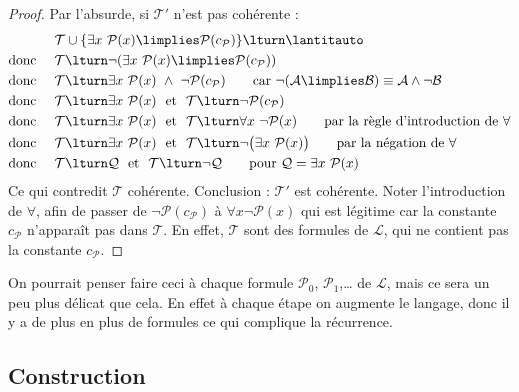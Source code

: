 \documentclass[11pt,class=report,crop=false]{standalone}
\begin{document}
\begin{proof}
	Par l'absurde, si $\mathcal{T}'$ n'est pas cohérente :
	\begin{align*}
		& \mathcal{T} \cup \{\exists x\ \mathcal{P}(x) \limplies \mathcal{P}(c_{\mathcal{P}})\} \lturn \lantitauto \\
		\text{donc } \quad & \mathcal{T} \lturn \lnot (\exists x\ \mathcal{P}(x) \limplies \mathcal{P}(c_{\mathcal{P}})) \\
		\text{donc } \quad & \mathcal{T} \lturn \exists x\ \mathcal{P}(x) \ \land \ \lnot \mathcal{P}(c_{\mathcal{P}}) \qquad \text{car } \lnot(\mathcal{A} \limplies \mathcal{B}) \equiv \mathcal{A} \land \lnot \mathcal{B} \\
		\text{donc } \quad & \mathcal{T} \lturn \exists x\ \mathcal{P}(x)
		\ \text{ et  } \ \mathcal{T} \lturn \lnot \mathcal{P}(c_{\mathcal{P}}) \\		
		\text{donc } \quad & \mathcal{T} \lturn \exists x\ \mathcal{P}(x)
\ \text{ et  } \ \mathcal{T} \lturn \forall x \ \lnot \mathcal{P}(x) \qquad \text{par la règle d'introduction de $\forall$}\\
		\text{donc } \quad & \mathcal{T} \lturn \exists x\ \mathcal{P}(x)
\ \text{ et  } \ \mathcal{T} \lturn \lnot\big(\exists x \ \mathcal{P}(x)\big) \qquad \text{par la négation de $\forall$}\\
		\text{donc } \quad & \mathcal{T} \lturn \mathcal{Q}
\ \text{ et  } \ \mathcal{T} \lturn \lnot \mathcal{Q} \qquad \text{pour $\mathcal{Q} = \exists x \ \mathcal{P}(x)$}
	\end{align*}
	Ce qui contredit $\mathcal{T}$ cohérente. Conclusion : $\mathcal{T}'$ est cohérente.
	Noter l'introduction de $\forall$, afin de passer de \og{}$\lnot \mathcal{P}(c_{\mathcal{P}})$\fg{} à \og{}$\forall x \lnot \mathcal{P}(x)$\fg{} qui est légitime car la constante $c_{\mathcal{P}}$ n'apparaît pas dans $\mathcal{T}$. En effet, $\mathcal{T}$ sont des formules de $\mathcal{L}$, qui ne contient pas la constante $c_{\mathcal{P}}$.
\end{proof}

On pourrait penser faire ceci à chaque formule $\mathcal{P}_0$, $\mathcal{P}_1$,\ldots{} de $\mathcal{L}$, mais ce sera un peu plus délicat que cela. En effet à chaque étape on augmente le langage, donc il y a de plus en plus de formules ce qui complique la récurrence.

\subsection{Construction}
\end{document}
